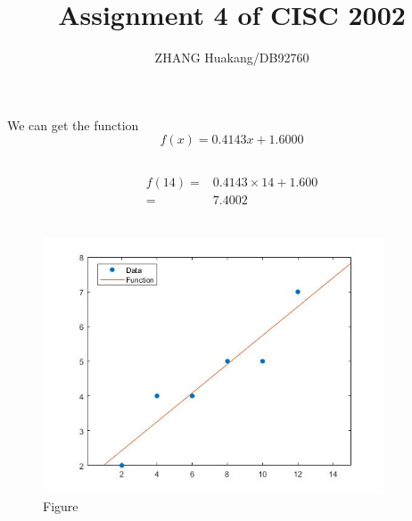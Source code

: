 \documentclass{article}
\title{Assignment 4 of CISC 2002}
\author{ZHANG Huakang/DB92760}
\begin{document}
    \maketitle
    \section{}
        \subsection{}
        
        
        We can get the function
        $$f(x)=0.4143 x+1.6000$$
    \subsection{}
        \begin{equation*}
            \begin{split}
                f(14)=&0.4143\times 14+1.600\\
                    =&7.4002\\
            \end{split}
        \end{equation*}
    \subsection{}
        \begin{figure}[H] 
            \centering 
            \includegraphics[width=0.9\textwidth]{img/Assignement_4_1_1.jpg}
            \caption{Figure} 
        \end{figure}
\end{document}
